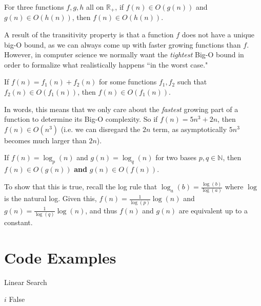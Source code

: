 \begin{flex}
    \begin{definition}[Transitivity]\label{def:bigO::trans}
    For three functions $f, g, h$ all on $\mathbb{R}_+$, if $f(n) \in O(g(n))$ and $g(n) \in O(h(n))$, then $f(n) \in O(h(n))$.
\end{definition}

A result of the transitivity property is that a function $f$ does not have a unique big-O bound, as we can always come up with faster growing functions than $f$. However, in computer science we normally want the \emph{tightest} Big-O bound in order to formalize what realistically happens ``in the worst case."
\end{flex}


\begin{flex}
    \begin{definition}\label{def:bigO::loa}
    If $f(n) = f_1(n) + f_2(n)$ for some functions $f_1, f_2$ such that $f_2(n) \in O(f_1(n))$, then $f(n) \in O(f_1(n))$.
\end{definition}

In words, this means that we only care about the \emph{fastest} growing part of a function to determine its Big-O complexity. So if $f(n) = 5n^3 + 2n$, then $f(n) \in O(n^3)$ (i.e. we can disregard the $2n$ term, as asymptotically $5n^3$ becomes much larger than $2n$).
\end{flex}

\begin{flex}
    \begin{definition}\label{def:bigO::le}
    If $f(n) = \log_p(n)$ and $g(n) = \log_q(n)$ for two bases $p, q \in \mathbb{N}$, then $f(n) \in O(g(n))$ \textbf{and} $g(n) \in O(f(n))$.
\end{definition}

To show that this is true, recall the log rule that $\log_a(b) = \frac{\log(b)}{\log(a)}$ where $\log$ is the natural log. Given this, $f(n) = \frac{1}{\log(p)}\log(n)$ and $g(n) = \frac{1}{\log(q)}\log(n)$, and thus $f(n)$ and $g(n)$ are equivalent up to a constant.
\end{flex}


\section{Code Examples}

\begin{algorithm}[H]
    \caption{Linear Search}
    \label{alg:linear-search}
    \begin{algorithmic}[1]
             
                   
                \State \Return $i$  
                \EndIf
            \EndFor
            \Return False
        \EndProcedure
    \end{algorithmic}
\end{algorithm}

